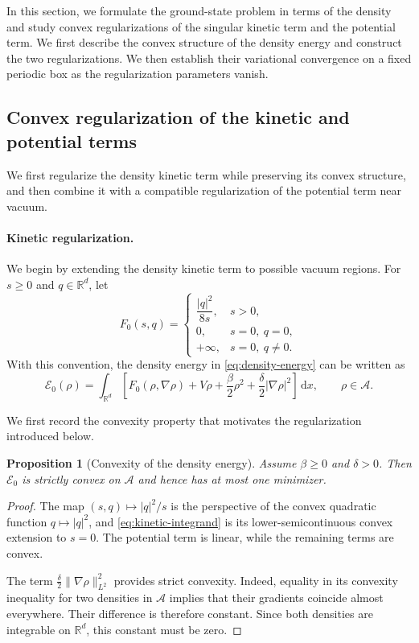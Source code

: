 \documentclass[11pt]{article}
\newcommand{\R}{\mathbb{R}}
\newcommand{\A}{\mathcal{A}}
\newcommand{\E}{\mathcal{E}}
\newcommand{\dd}{\,\mathrm{d}}
\theoremstyle{plain}
\newtheorem{proposition}[theorem]{Proposition}
\theoremstyle{definition}
\numberwithin{equation}{section}
\begin{document}
In this section, we formulate the ground-state problem in terms of the
density and study convex regularizations of the singular kinetic term
and the potential term. We first describe the convex structure of the
density energy and construct the two regularizations. We then
establish their variational convergence on a fixed periodic box as the
regularization parameters vanish.


\subsection{Convex regularization of the kinetic and potential terms}

We first regularize the density kinetic term while preserving its
convex structure, and then combine it with a compatible regularization
of the potential term near vacuum.

\paragraph{Kinetic regularization.}

We begin by extending the density kinetic term to possible vacuum
regions.
For $s\ge0$ and $q\in\R^d$, let
\begin{equation}
\label{eq:kinetic-integrand}
F_0(s,q)
=
\begin{cases}
\dfrac{|q|^2}{8s}, & s>0,\\[1ex]
0, & s=0,\ q=0,\\
+\infty, & s=0,\ q\ne0.
\end{cases}
\end{equation}
With this convention, the density energy in
\eqref{eq:density-energy} can be written as
\begin{equation}
\label{eq:density-energy-extended}
\E_0(\rho)
=
\int_{\R^d}
\left[
F_0(\rho,\nabla\rho)
+V\rho
+\frac{\beta}{2}\rho^2
+\frac{\delta}{2}|\nabla\rho|^2
\right]\dd x,
\qquad
\rho\in\A.
\end{equation}

We first record the convexity property that motivates the
regularization introduced below.

\begin{proposition}[Convexity of the density energy]
\label{prop:density-convexity}
Assume $\beta\ge0$ and $\delta>0$.
Then $\E_0$ is strictly convex on $\A$ and hence has at most one
minimizer.
\end{proposition}

\begin{proof}
The map $(s,q)\mapsto |q|^2/s$ is the perspective of the convex
quadratic function $q\mapsto |q|^2$, and
\eqref{eq:kinetic-integrand} is its lower-semicontinuous convex
extension to $s=0$. The potential term is linear, while the remaining
terms are convex.

The term
$\frac{\delta}{2}\|\nabla\rho\|_{L^2}^2$
provides strict convexity. Indeed, equality in its convexity
inequality for two densities in $\A$ implies that their gradients
coincide almost everywhere. Their difference is therefore constant.
Since both densities are integrable on $\R^d$, this constant must be
zero.
\end{proof}
\end{document}
